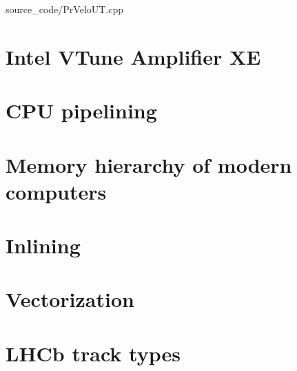 \documentclass[12pt]{article}
\begin{document}

	{source_code/PrVeloUT.cpp}


\appendix

\newpage
\section{Intel VTune Amplifier XE}

\section{CPU pipelining}

\section{Memory hierarchy of modern computers}

\section{Inlining}

\section{Vectorization}

\section{LHCb track types}
\end{document}
